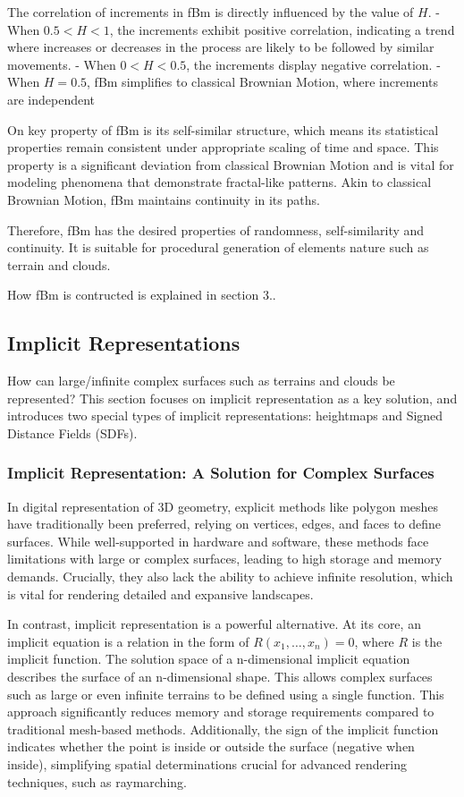 The correlation of increments in fBm is directly influenced by the value of $H$. 
- When $0.5 < H < 1$, the increments exhibit positive correlation, indicating a trend where increases or decreases in the process are likely to be followed by similar movements.
- When $0 < H < 0.5$, the increments display negative correlation.
- When $H=0.5$, fBm simplifies to classical Brownian Motion, where increments are independent

On key property of fBm is its self-similar structure, which means its statistical properties remain consistent under appropriate scaling of time and space. This property is a significant deviation from classical Brownian Motion and is vital for modeling phenomena that demonstrate fractal-like patterns. Akin to classical Brownian Motion, fBm maintains continuity in its paths.

Therefore, fBm has the desired properties of randomness, self-similarity and continuity. It is suitable for procedural generation of elements nature such as terrain and clouds.

How fBm is contructed is explained in section 3.\todo{}.

\subsection{Implicit Representations}

How can large/infinite complex surfaces such as terrains and clouds be represented? This section focuses on implicit representation as a key solution, and introduces two special types of  implicit representations: heightmaps and Signed Distance Fields (SDFs).

\subsubsection{Implicit Representation: A Solution for Complex Surfaces}

In digital representation of 3D geometry, explicit methods like polygon meshes have traditionally been preferred, relying on vertices, edges, and faces to define surfaces. While well-supported in hardware and software, these methods face limitations with large or complex surfaces, leading to high storage and memory demands. Crucially, they also lack the ability to achieve infinite resolution, which is vital for rendering detailed and expansive landscapes.

In contrast, implicit representation is a powerful alternative. At its core, an implicit equation is a relation in the form of $R(x_1,\dots,x_n)=0$, where $R$ is the implicit function. The solution space of a n-dimensional implicit equation describes the surface of an n-dimensional shape. This allows complex surfaces such as large or even infinite terrains to be defined using a single function. This approach significantly reduces memory and storage requirements compared to traditional mesh-based methods. Additionally, the sign of the implicit function indicates whether the point is inside or outside the surface (negative when inside), simplifying spatial determinations crucial for advanced rendering techniques, such as raymarching.

